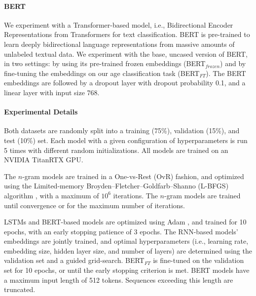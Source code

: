 \paragraph{BERT} 
We experiment with a Transformer-based model, i.e., 
Bidirectional Encoder Representations from Transformers \cite[BERT;][]{devlin-etal-2019-bert} for text classification.
BERT is pre-trained to learn deeply bidirectional language representations from massive amounts of unlabeled textual data. 
We experiment with the base, uncased version of BERT, in two settings: by using its 
pre-trained frozen embeddings (BERT$_{frozen}$) and by fine-tuning the embeddings on our age classification task (BERT$_{FT}$).
The BERT embeddings are followed by a dropout layer with dropout probability 0.1, and a linear layer with input size 768.

\paragraph{Experimental Details} %

Both datasets are randomly split into a training (75\%), validation (15\%), and test (10\%) set.
Each model with a given configuration of hyperparameters is run 5 times with different random initializations. All models are trained on an NVIDIA TitanRTX GPU.

The $n$-gram models are trained in a One-vs-Rest (OvR) fashion, and optimized using the Limited-memory Broyden–Fletcher–Goldfarb–Shanno (L-BFGS) algorithm \cite{liu1989limited}, with a maximum of $10^6$ iterations. The $n$-gram models are trained until convergence or for the maximum number of iterations.

LSTMs and BERT-based models
are optimized using Adam \citep{DBLP:journals/corr/KingmaB14}, and trained for 10 epochs, with an early stopping patience of 3 epochs.
The RNN-based models' embeddings are jointly trained, and optimal hyperparameters (i.e., learning rate, embedding size, hidden layer size, and number of layers)  are determined using the validation set and a guided grid-search. %
BERT$_{FT}$ is fine-tuned on the validation set for 10 epochs, or until the early stopping criterion is met.
BERT models have a maximum input length of 512 tokens. Sequences exceeding this length are truncated.